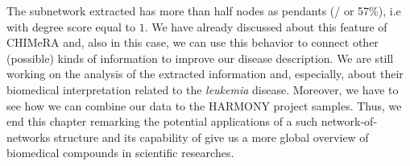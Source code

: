 \documentclass{standalone}
\begin{document}
The subnetwork extracted has more than half nodes as pendants (/ or 57\%), i.e with degree score equal to $1$.
We have already discussed about this feature of \textsf{CHIMeRA} and, also in this case, we can use this behavior to connect other (possible) kinds of information to improve our disease description.
We are still working on the analysis of the extracted information and, especially, about their biomedical interpretation related to the \emph{leukemia} disease.
Moreover, we have to see how we can combine our data to the HARMONY project samples.
Thus, we end this chapter remarking the potential applications of a such network-of-networks structure and its capability of give us a more global overview of biomedical compounds in scientific researches.
\end{document}
